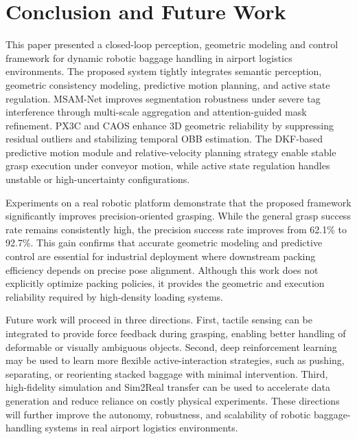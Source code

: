 \section{Conclusion and Future Work}
This paper presented a closed-loop perception, geometric modeling and control framework for dynamic robotic baggage handling in airport logistics environments. The proposed system tightly integrates semantic perception, geometric consistency modeling, predictive motion planning, and active state regulation. MSAM-Net improves segmentation robustness under severe tag interference through multi-scale aggregation and attention-guided mask refinement. PX3C and CAOS enhance 3D geometric reliability by suppressing residual outliers and stabilizing temporal OBB estimation. The DKF-based predictive motion module and relative-velocity planning strategy enable stable grasp execution under conveyor motion, while active state regulation handles unstable or high-uncertainty configurations.

Experiments on a real robotic platform demonstrate that the proposed framework significantly improves precision-oriented grasping. While the general grasp success rate remains consistently high, the precision success rate improves from 62.1\% to 92.7\%. This gain confirms that accurate geometric modeling and predictive control are essential for industrial deployment where downstream packing efficiency depends on precise pose alignment. Although this work does not explicitly optimize packing policies, it provides the geometric and execution reliability required by high-density loading systems.

Future work will proceed in three directions. First, tactile sensing can be integrated to provide force feedback during grasping, enabling better handling of deformable or visually ambiguous objects. Second, deep reinforcement learning may be used to learn more flexible active-interaction strategies, such as pushing, separating, or reorienting stacked baggage with minimal intervention. Third, high-fidelity simulation and Sim2Real transfer can be used to accelerate data generation and reduce reliance on costly physical experiments. These directions will further improve the autonomy, robustness, and scalability of robotic baggage-handling systems in real airport logistics environments.